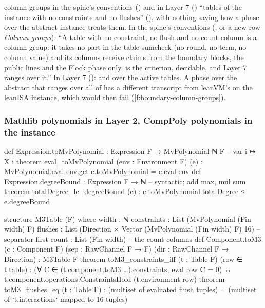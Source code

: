 \begin{change}{column groups in the spine's conventions () and in Layer 7 ()}
\asis \enquote{tables of the instance with no constraints and no flushes} (),
with nothing saying how a phase over the abstract instance treats them.
\asproposed In the spine's conventions (, or a new row \emph{Column groups}):
\enquote{A table with no constraint, no flush and no count column is a column group: it takes no
part in the table sumcheck (no round, no term, no column value) and its columns receive claims
from the boundary blocks, the public lines and the Flock phase only.
 is the
criterion, decidable, and Layer 7 ranges over it.} In Layer 7 ():  and
 over the active tables.
\reason A phase over the abstract  that ranges over all of  has a different
transcript from leanVM's on the leanISA instance, which  would then fail
(\cref{f:boundary-column-groups}).
\end{change}

\subsubsection{Mathlib polynomials in Layer 2, CompPoly polynomials in the instance}\label{sec:gen-boundary-st-poly}

\begin{leancode}
def Expression.toMvPolynomial : Expression F → MvPolynomial ℕ F     -- var i ↦ X i
theorem eval_toMvPolynomial (env : Environment F) (e) :
    MvPolynomial.eval env.get e.toMvPolynomial = e.eval env
def Expression.degreeBound : Expression F → ℕ                      -- syntactic; add max, mul sum
theorem totalDegree_le_degreeBound (e) : e.toMvPolynomial.totalDegree ≤ e.degreeBound

structure M3Table (F) where
  width : ℕ
  constraints : List (MvPolynomial (Fin width) F)
  flushes : List (Direction × Vector (MvPolynomial (Fin width) F) 16)   -- separator first
  count : List (Fin width)                                             -- the count columns
def Component.toM3 (c : Component F) (sep : RawChannel F → F) (dir : RawChannel F → Direction) :
    M3Table F
theorem toM3_constraints_iff (t : Table F) (row ∈ t.table) :
    (∀ C ∈ (t.component.toM3 …).constraints, eval row C = 0) ↔ t.component.operations.ConstraintsHold (t.environment row)
theorem toM3_flushes_eq (t : Table F) : (multiset of evaluated flush tuples) = (multiset of `t.interactions` mapped to 16-tuples)
\end{leancode}

